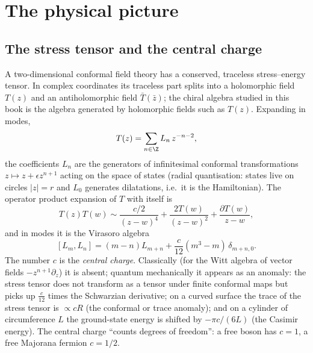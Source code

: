 \section{The physical picture}\label{l06:sec:physics}

\subsection{The stress tensor and the central charge}

A two-dimensional conformal field theory has a conserved, traceless stress--energy tensor. In complex
coordinates its traceless part splits into a holomorphic field $T(z)$ and an antiholomorphic field
$\bar T(\bar z)$; the chiral algebra studied in this book is the algebra generated by holomorphic
fields such as $T(z)$. Expanding in modes,
\begin{equation}\label{l06:eq:Tmodes}
 T(z) = \sum_{n\in\Z}L_n\,z^{-n-2},
\end{equation}
the coefficients $L_n$ are the generators of infinitesimal conformal transformations
$z\mapsto z+\epsilon z^{n+1}$ acting on the space of states (radial quantisation: states live on
circles $|z| = r$ and $L_0$ generates dilatations, i.e.\ it is the Hamiltonian). The operator product
expansion of $T$ with itself is
\begin{equation}\label{l06:eq:TT}
 T(z)T(w) \sim \frac{c/2}{(z-w)^4} + \frac{2T(w)}{(z-w)^2} + \frac{\partial T(w)}{z-w},
\end{equation}
and in modes it is the Virasoro algebra
\begin{equation}\label{l06:eq:vir}
 [L_m,L_n] = (m-n)L_{m+n} + \frac{c}{12}(m^3-m)\,\delta_{m+n,0}.
\end{equation}
The number $c$ is the \emph{central charge}. Classically (for the Witt algebra of vector fields
$-z^{n+1}\partial_z$) it is absent; quantum mechanically it appears as an anomaly: the stress tensor
does not transform as a tensor under finite conformal maps but picks up $\frac{c}{12}$ times the
Schwarzian derivative; on a curved surface the trace of the stress tensor is $\propto c R$ (the
conformal or trace anomaly); and on a cylinder of circumference $L$ the ground-state energy is shifted
by $-\pi c/(6L)$ (the Casimir energy). The central charge ``counts degrees of freedom'': a free boson
has $c = 1$, a free Majorana fermion $c = 1/2$.

